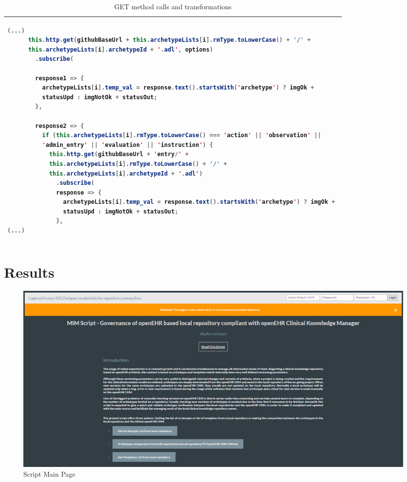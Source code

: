 \documentclass[mim_thesis.tex]{subfiles}
\begin{document}
\begin{table}[H]
\caption{GET method calls and transformations}
\label{tab:code_calls}
\centering
\begin{tabular}{l}
\toprule[2pt]
\begin{lstlisting}[language=java]
(...)
      this.http.get(githubBaseUrl + this.archetypeLists[i].rmType.toLowerCase() + '/' + 
      this.archetypeLists[i].archetypeId + '.adl', options)
        .subscribe(
        
        response1 => {
          archetypeLists[i].temp_val = response.text().startsWith('archetype') ? imgOk + 
          statusUpd : imgNotOk + statusOut;
        },

        response2 => {
          if (this.archetypeLists[i].rmType.toLowerCase() === 'action' || 'observation' || 
          'admin_entry' || 'evaluation' || 'instruction') {
            this.http.get(githubBaseUrl + 'entry/' + 
            this.archetypeLists[i].rmType.toLowerCase() + '/' + 
            this.archetypeLists[i].archetypeId + '.adl')
              .subscribe(
              response => {
                archetypeLists[i].temp_val = response.text().startsWith('archetype') ? imgOk + 
                statusUpd : imgNotOk + statusOut;
              },
(...)
\end{lstlisting}
\tabularnewline \bottomrule[2pt]
\end{tabular}
\end{table}




\section{Results}

\begin{figure}[H]
	\centering
    \includegraphics[width=1\textwidth]{img/script_main_page.PNG}
	\caption{Script Main Page }
	\label{fig:script_main_page}
\end{figure}
\end{document}
